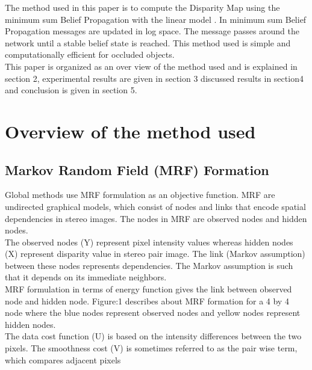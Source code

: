 \documentclass{singlecol-new}
\theoremstyle{TH}{
\newtheorem{lemma}{Lemma}
\newtheorem{theorem}[lemma]{Theorem}
\newtheorem{corrolary}[lemma]{Corrolary}
\newtheorem{conjecture}[lemma]{Conjecture}
\newtheorem{proposition}[lemma]{Proposition}
\newtheorem{claim}[lemma]{Claim}
\newtheorem{stheorem}[lemma]{Wrong Theorem}
\newtheorem{algorithm}{Algorithm}
}
\theoremstyle{THrm}{
\newtheorem{definition}{Definition}[section]
\newtheorem{question}{Question}[section]
\newtheorem{remark}{Remark}
\newtheorem{scheme}{Scheme}
}
\theoremstyle{THhit}{
\newtheorem{case}{Case}[section]
}
\begin{document}
The method used in this paper is to compute the Disparity Map using the minimum sum Belief Propagation with the linear model . In minimum sum Belief Propagation messages are updated in log space. The message passes around the network until a stable belief state is reached. This method used is simple and computationally efficient for occluded objects.\\
This paper is organized as an over view of the method used and is explained in section 2, experimental results are given in section 3 discussed results in section4 and conclusion is given in section 5.






\section{Overview of the method used}








\subsection{Markov Random Field (MRF) Formation}








Global methods use MRF formulation as an objective function. MRF are undirected graphical models, which consist of nodes and links that encode spatial dependencies in stereo images. The nodes in MRF are observed nodes and hidden nodes.\\
The observed nodes (Y) represent pixel intensity values whereas hidden nodes (X) represent disparity value in stereo pair image. The link (Markov assumption) between these nodes represents dependencies. The   Markov assumption is such that it depends on its immediate neighbors.\\
MRF formulation in terms of energy function  gives the link between observed node and hidden node. Figure:1 describes about    MRF formation for a 4 by 4 node where the blue nodes represent observed nodes and yellow nodes represent hidden nodes.\\
The data cost function (U) is based on the intensity differences between the two pixels. The smoothness cost (V) is sometimes referred to as the pair wise term, which compares adjacent pixels
\end{document}
